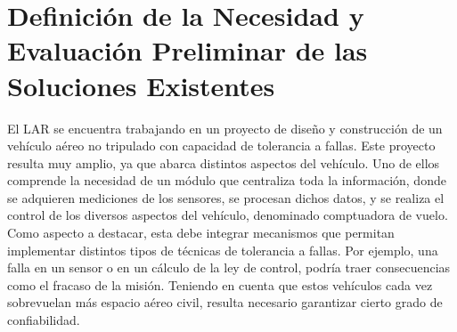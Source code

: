 \section{Definición de la Necesidad y Evaluación Preliminar de las Soluciones Existentes}



El LAR se encuentra trabajando en un proyecto de diseño y construcción de un vehículo aéreo no tripulado con capacidad de tolerancia a fallas. Este proyecto resulta muy amplio, ya que abarca distintos aspectos del vehículo. Uno de ellos comprende la necesidad de un módulo que centraliza toda la información, donde se adquieren mediciones de los sensores, se procesan dichos datos, y se realiza el control de los diversos aspectos del vehículo, denominado comptuadora de vuelo. Como aspecto a destacar, esta debe integrar mecanismos que permitan implementar distintos tipos de técnicas de tolerancia a fallas. Por ejemplo, una falla en un sensor o en un cálculo de la ley de control, podría traer consecuencias como el fracaso de la misión. Teniendo en cuenta que estos vehículos cada vez sobrevuelan más espacio aéreo civil, resulta necesario garantizar cierto grado de confiabilidad.\\

